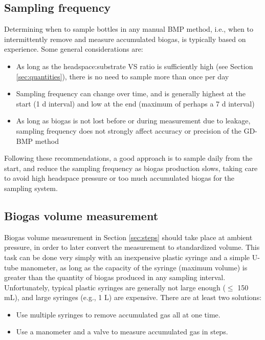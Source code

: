 \documentclass[]{article}
\begin{document}
\subsection{Sampling frequency}
\label{sec:freq}

Determining when to sample bottles in any manual BMP method, i.e., when to intermittently remove and measure accumulated biogas, is typically based on experience. 
Some general considerations are:
\begin{itemize}
	\item As long as the headspace:substrate VS ratio is sufficiently high (see Section \ref{sec:quantities}), there is no need to sample more than once per day
  \item Sampling frequency can change over time, and is generally highest at the start (1 d interval) and low at the end (maximum of perhaps a 7 d interval)
  \item As long as biogas is not lost before or during measurement due to leakage, sampling frequency does not strongly affect accuracy or precision of the GD-BMP method
\end{itemize}

Following these recommendations, a good approach is to sample daily from the start, and reduce the sampling frequency as biogas production slows, taking care to avoid high headspace pressure or too much accumulated biogas for the sampling system.

\subsection{Biogas volume measurement}
\label{sec:volmeas}
Biogas volume measurement in Section \ref{sec:steps} should take place at ambient pressure, in order to later convert the measurement to standardized volume.
This task can be done very simply with an inexpensive plastic syringe and a simple U-tube manometer, as long as the capacity of the syringe (maximum volume) is greater than the quantity of biogas produced in any sampling interval.
Unfortunately, typical plastic syringes are generally not large enough ($\le$ 150 mL), and large syringes (e.g., 1 L) are expensive.
There are at least two solutions:
\begin{itemize}
  \item Use multiple syringes to remove accumulated gas all at one time. %
  \item Use a manometer and a valve to measure accumulated gas in steps. 
\end{itemize}
\end{document}
